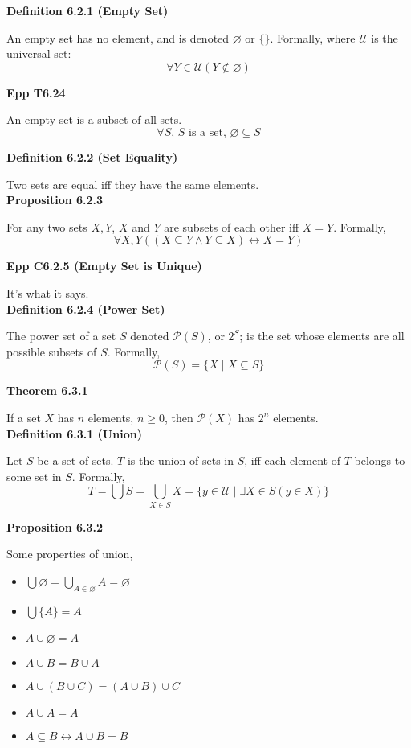 \documentclass[a4paper]{article}
\newcommand{\subheading}[1]{{\scriptsize\textbf{#1}}}
\begin{document}
\begin{multicols*}{4}
\subheading{Definition 6.2.1 (Empty Set)}

An empty set has no element, and is denoted $\varnothing$ or $\{\}$. Formally,
where $\mathcal{U}$ is the universal set: $$\forall Y \in \mathcal{U} (Y \not\in
\varnothing)$$

\subheading{Epp T6.24}

An empty set is a subset of all sets.
$$\forall S\text{, $S$ is a set, }\varnothing \subseteq S$$

\subheading{Definition 6.2.2 (Set Equality)}

Two sets are equal iff they have the same elements.\\

\subheading{Proposition 6.2.3}

For any two sets $X, Y$, $X$ and $Y$ are subsets of each other iff $X = Y$.
Formally,
$$\forall X, Y((X \subseteq Y \land Y \subseteq X) \longleftrightarrow X=Y)$$

\subheading{Epp C6.2.5 (Empty Set is Unique)}

It's what it says.\\

\subheading{Definition 6.2.4 (Power Set)}

The power set of a set $S$ denoted $\mathcal{P}(S)$, or $2^S$; is the set whose
elements are all possible subsets of $S$. Formally,
$$\mathcal{P}(S) = \{X\;|\;X\subseteq S\}$$

\subheading{Theorem 6.3.1}

If a set $X$ has $n$ elements, $n \geq 0$, then $\mathcal{P}(X)$ has $2^n$
elements. \\

\subheading{Definition 6.3.1 (Union)}

Let $S$ be a set of sets. $T$ is the union of sets in $S$, iff each element of
$T$ belongs to some set in $S$. Formally,
$$T=\bigcup S = \bigcup_{X\in S} X = \{ y \in \mathcal{U}\;|\;\exists X \in S (y
\in X)\}$$

\subheading{Proposition 6.3.2}

Some properties of union,
\begin{itemize}[leftmargin=*] \itemsep -0.3em
  \item $\bigcup \varnothing = \bigcup_{A \in \varnothing} A = \varnothing$
  \item $\bigcup \{A\} = A$
  \item $A \cup \varnothing = A$
  \item $A \cup B = B \cup A$
  \item $A \cup (B \cup C) = (A \cup B) \cup C$
  \item $A \cup A = A$
  \item $A \subseteq B \longleftrightarrow A \cup B = B$
\end{itemize}


\end{multicols*}
\end{document}

